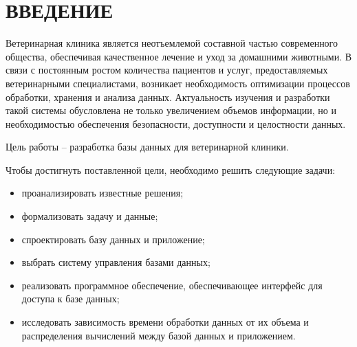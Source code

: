 \section*{ВВЕДЕНИЕ}

Ветеринарная клиника является неотъемлемой составной частью современного общества, обеспечивая качественное лечение и уход за домашними животными. В связи с постоянным ростом количества пациентов и услуг, предоставляемых ветеринарными специалистами, возникает необходимость оптимизации процессов обработки, хранения и анализа данных. Актуальность изучения и разработки такой системы обусловлена не только увеличением объемов информации, но и необходимостью обеспечения безопасности, доступности и целостности данных. 

Цель работы -- разработка базы данных для ветеринарной клиники.

Чтобы достигнуть поставленной цели, необходимо решить следующие задачи:
\begin{itemize}[label*=---]
	\item проанализировать известные решения;
    \item формализовать задачу и данные;
    \item спроектировать базу данных и приложение;
    \item выбрать систему управления базами данных;
    \item реализовать программное обеспечение, обеспечивающее интерфейс для доступа к базе данных;
    \item исследовать зависимость времени обработки данных от их объема и распределения вычислений между базой данных и приложением.
\end{itemize}

